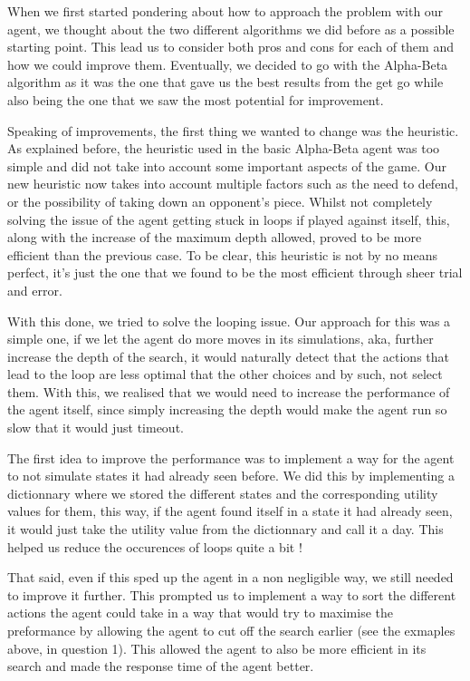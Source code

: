 \documentclass[11pt,a4paper]{report}
\begin{document}
\begin{answers}[21cm]
    When we first started pondering about how to approach the problem with our agent, we thought about the two different algorithms 
    we did before as a possible starting point. This lead us to consider both pros and cons for each of them and how we could improve them.
    Eventually, we decided to go with the Alpha-Beta algorithm as it was the one that gave us the best results from the get go
    while also being the one that we saw the most potential for improvement. 
    
    Speaking of improvements, the first thing we wanted to change was the heuristic. As explained before, the heuristic
    used in the basic Alpha-Beta agent was too simple and did not take into account some important aspects of the game. 
    Our new heuristic now takes into account multiple factors such as the need to defend, or the possibility of taking down
    an opponent's piece. Whilst not completely solving the issue of the agent getting stuck in loops if played against itself,
    this, along with the increase of the maximum depth allowed, proved to be more efficient than the previous case.
    To be clear, this heuristic is not by no means perfect, it's just the one that we found to be the most efficient through
    sheer trial and error.

    With this done, we tried to solve the looping issue. Our approach for this was a simple one, if we let the agent do more 
    moves in its simulations, aka, further increase the depth of the search, it would naturally detect that the actions that lead to 
    the loop are less optimal that the other choices and by such, not select them. With this, we realised that we would need to 
    increase the performance of the agent itself, since simply increasing the depth would make the agent run so slow that it would
    just timeout. 

    The first idea to improve the performance was to implement a way for the agent to not simulate states it had already seen before. 
    We did this by implementing a dictionnary where we stored the different states and the corresponding utility values for them, 
    this way, if the agent found itself in a state it had already seen, it would just take the utility value from the dictionnary and
    call it a day. This helped us reduce the occurences of loops quite a bit !

    That said, even if this sped up the agent in a non negligible way, we still needed to improve it further. This prompted us to 
    implement a way to sort the different actions the agent could take in a way that would try to maximise the preformance 
    by allowing the agent to cut off the search earlier (see the exmaples above, in question 1). 
    This allowed the agent to also be more efficient in its search and made the response time of the agent better. 


\end{answers}
\end{document}
